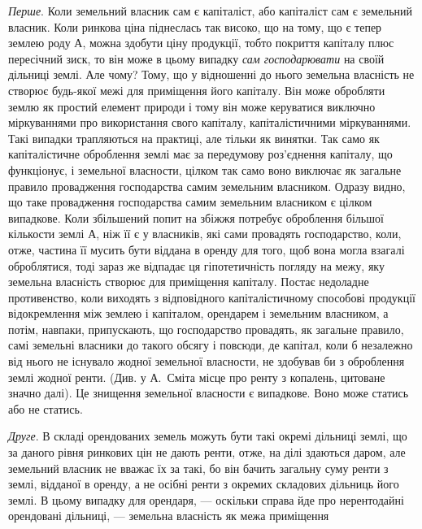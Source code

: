 \emph{Перше}. Коли земельний власник сам є капіталіст, або капіталіст сам є
земельний власник. Коли ринкова ціна піднеслась так високо, що на тому,
що є тепер землею роду $А$, можна здобути ціну продукції, тобто покриття капіталу
плюс пересічний зиск, то він може в цьому випадку \emph{сам господарювати}
на своїй дільниці землі. Але чому? Тому, що у відношенні до нього земельна
власність не створює будь-якої межі для приміщення його капіталу.
Він може обробляти землю як простий елемент природи і тому він може керуватися
виключно міркуваннями про використання свого капіталу, капіталістичними
міркуваннями. Такі випадки трапляються на практиці, але тільки як винятки.
Так само як капіталістичне оброблення землі має за передумову роз’єднення капіталу,
що функціонує, і земельної власности, цілком так само воно виключає як
загальне правило провадження господарства самим земельним власником. Одразу
видно, що таке провадження господарства самим земельним власником є цілком
випадкове. Коли збільшений попит на збіжжя потребує оброблення більшої кількости
землі $А$, ніж її є у власників, які сами провадять господарство, коли, отже,
частина її мусить бути віддана в оренду для того, щоб вона могла взагалі оброблятися,
тоді зараз же відпадає ця гіпотетичність погляду на межу, яку земельна
власність створює для приміщення капіталу. Постає недоладне противенство,
коли виходять з відповідного капіталістичному способові продукції відокремлення
між землею і капіталом, орендарем і земельним власником, а потім,
навпаки, припускають, що господарство провадять, як загальне правило, самі
земельні власники до такого обсягу і повсюди, де капітал, коли б незалежно
від нього не існувало жодної земельної власности, не здобував би з оброблення
землі жодної ренти. (Див. у А.~Сміта місце про ренту з копалень, цитоване
значно далі). Це знищення земельної власности є випадкове. Воно може статись
або не статись.

\emph{Друге}. В складі орендованих земель можуть бути такі окремі дільниці
землі, що за даного рівня ринкових цін не дають ренти, отже, на ділі здаються
даром, але земельний власник не вважає їх за такі, бо він бачить загальну суму
ренти з землі, відданої в оренду, а не осібні ренти з окремих складових дільниць
його землі. В цьому випадку для орендаря, — оскільки справа йде про
нерентодайні орендовані дільниці, — земельна власність як межа приміщення
\parbreak{}  %
